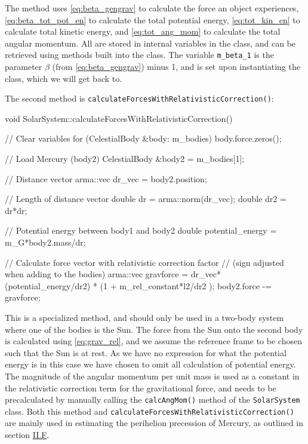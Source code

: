 \documentclass[reprint,english,notitlepage]{revtex4-1}  %
\begin{document}
The method uses \eqref{eq:beta_gengrav} to calculate the force an object experiences, \eqref{eq:beta_tot_pot_en} to calculate the total potential energy, \eqref{eq:tot_kin_en} to calculate total kinetic energy, and \eqref{eq:tot_ang_mom} to calculate the total angular momentum. All are stored in internal variables in the class, and can be retrieved using methods built into the class. The variable \verb+m_beta_1+ is the parameter $\beta$ (from \eqref{eq:beta_gengrav}) minus 1, and is set upon instantiating the class, which we will get back to. 

The second method is \verb+calculateForcesWithRelativisticCorrection()+:

\begin{cpp}
void SolarSystem::calculateForcesWithRelativisticCorrection() {
  // Clear variables
  for (CelestialBody &body: m_bodies) {
    body.force.zeros();
  }

  // Load Mercury (body2)
  CelestialBody &body2 = m_bodies[1];

  // Distance vector
  arma::vec dr_vec = body2.position;

  // Length of distance vector
  double dr = arma::norm(dr_vec);
  double dr2 = dr*dr;

  // Potential energy between body1 and body2
  double potential_energy = m_G*body2.mass/dr;

  // Calculate force vector with relativistic correction factor
  // (sign adjusted when adding to the bodies)
  arma::vec gravforce = dr_vec*(potential_energy/dr2)
  						* (1 + m_rel_constant*l2/dr2 );
  body2.force -= gravforce;
}
\end{cpp}

This is a specialized method, and should only be used in a two-body system where one of the bodies is the Sun. The force from the Sun onto the second body is calculated using \eqref{eq:grav_rel}, and we assume the reference frame to be chosen such that the Sun is at rest. As we have no expression for what the potential energy is in this case we have chosen to omit all calculation of potential energy. The magnitude of the angular momentum per unit mass is used as a constant in the relativistic correction term for the gravitational force, and needs to be precalculated by manually calling the \verb+calcAngMom()+ method of the \verb+SolarSystem+ class. Both this method and \verb+calculateForcesWithRelativisticCorrection()+ are mainly used in estimating the perihelion precession of Mercury, as outlined in section \hyperref[sec:II:f]{II.F}.
\end{document}
